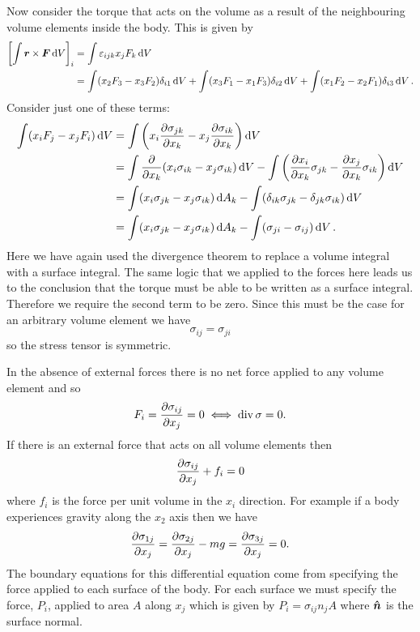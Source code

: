 \documentclass[a4paper]{article}
\DeclareMathOperator{\DIV}{div}
\begin{document}
    Now consider the torque that acts on the volume as a result of the neighbouring volume elements inside the body.
    This is given by
    \begin{align*}
        \left[ \int \bm{r}\times\bm{F} \dd{V} \right]_i &= \int \varepsilon_{ijk} x_jF_k \dd{V}\\
        &=  \int (x_2F_3 - x_3F_2)\delta_{i1} \dd{V} + \int (x_3F_1 - x_1F_3)\delta_{i2} \dd{V} + \int (x_1F_2 - x_2F_1)\delta_{i3} \dd{V}.
    \end{align*}
    Consider just one of these terms:
    \begin{align*}
        \int (x_iF_j - x_jF_i) \dd{V} &= \int \left( x_i\pdv{\sigma_{jk}}{x_k} - x_j\pdv{\sigma_{ik}}{x_k} \right)\dd{V}\\
        &= \int \pdv{x_k} (x_i\sigma_{ik} - x_j\sigma_{ik}) \dd{V} - \int \left( \pdv{x_i}{x_k}\sigma_{jk} - \pdv{x_j}{x_k}\sigma_{ik} \right)\dd{V}\\
        &= \int (x_i\sigma_{jk} - x_j\sigma_{ik})\dd{A_k} - \int (\delta_{ik}\sigma_{jk} - \delta_{jk}\sigma_{ik})\dd{V}\\
        &= \int (x_i\sigma_{jk} - x_j\sigma_{ik})\dd{A_k} - \int (\sigma_{ji} - \sigma_{ij})\dd{V}.\\
    \end{align*}
    Here we have again used the divergence theorem to replace a volume integral with a surface integral.
    The same logic that we applied to the forces here leads us to the conclusion that the torque must be able to be written as a surface integral.
    Therefore we require the second term to be zero.
    Since this must be the case for an arbitrary volume element we have
    \[\sigma_{ij} = \sigma_{ji}\]
    so the stress tensor is symmetric.
    
    In the absence of external forces there is no net force applied to any volume element and so
    \[F_i = \pdv{\sigma_{ij}}{x_j} = 0 \iff \DIV\sigma = 0.\]
    If there is an external force that acts on all volume elements then
    \[\pdv{\sigma_{ij}}{x_j} + f_i = 0\]
    where \(f_i\) is the force per unit volume in the \(x_i\) direction.
    For example if a body experiences gravity along the \(x_2\) axis then we have
    \[\pdv{\sigma_{1j}}{x_j} = \pdv{\sigma_{2j}}{x_j} - mg = \pdv{\sigma_{3j}}{x_j} = 0.\]
    The boundary equations for this differential equation come from specifying the force applied to each surface of the body.
    For each surface we must specify the force, \(P_i\), applied to area \(A\) along \(x_j\) which is given by \(P_i = \sigma_{ij}n_jA\) where \(\bm{\hat{n}}\) is the surface normal.
    
\end{document}
